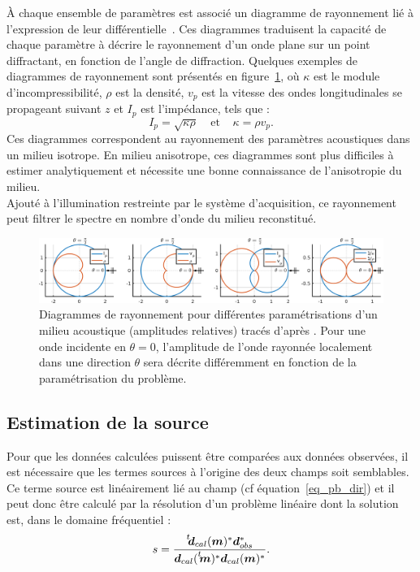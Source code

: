 À chaque ensemble de paramètres est associé un diagramme de rayonnement lié à l'expression de leur différentielle~\citep{forgues}. Ces diagrammes traduisent la capacité de chaque paramètre à décrire le rayonnement d'un onde plane sur un point diffractant, en fonction de l'angle de diffraction. Quelques exemples de diagrammes de rayonnement sont présentés en figure~\ref{rayonnement}, où $\kappa$ est le module d'incompressibilité, $\rho$ est la densité, $v_{p}$ est la vitesse des ondes longitudinales se propageant suivant $z$ et $I_{p}$ est l'impédance, tels que : 
\begin{equation*}
	I_{p}=\sqrt{\kappa \rho}~~~~~\text{et}~~~~~\kappa=\rho v_{p}\text{.}
\end{equation*}
Ces diagrammes correspondent au rayonnement des paramètres acoustiques dans un milieu isotrope. En milieu anisotrope, ces diagrammes sont plus difficiles à estimer analytiquement et nécessite une bonne connaissance de l'anisotropie du milieu.\\

Ajouté à l'illumination restreinte  par le système d'acquisition, ce rayonnement peut filtrer le spectre en nombre d'onde du milieu reconstitué. 


\begin{figure}[!h]
	\hspace{-1cm}\includegraphics[width=1.1\textwidth]{img/rayonnement.png}
	\caption{Diagrammes de rayonnement pour différentes paramétrisations d'un milieu acoustique (amplitudes relatives) tracés d'après \cite{forgues}. Pour une onde incidente en $\theta=0$, l'amplitude de l'onde rayonnée localement dans une direction $\theta$ sera décrite différemment en fonction de la paramétrisation du problème. \label{rayonnement}}
\end{figure}

\subsection{Estimation de la source}
Pour que les données calculées puissent être comparées aux données observées, il est nécessaire que les termes sources à l'origine des deux champs soit semblables. Ce terme source est linéairement lié au champ (cf équation~\ref{eq_pb_dir}) et il peut donc être calculé par la résolution d'un problème linéaire \citep{pratt_99} dont la solution est, dans le domaine fréquentiel : 
\begin{equation}
s=\frac{\tr{\bm{d}_{cal}(\bm{m})^{*}}\bm{d}_{obs}^{*}}{\bm{d}_{cal}(\tr{\bm{m})^{*}}\bm{d}_{cal}(\bm{m})^{*}}\text{.}
\end{equation}
 


